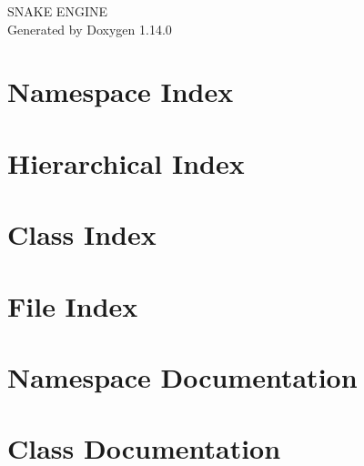 \documentclass[twoside]{book}
\newcommand{\+}{\discretionary{\mbox{\scriptsize$\hookleftarrow$}}{}{}}
\newcommand{\clearemptydoublepage}{%
    \newpage{\pagestyle{empty}\cleardoublepage}%
  }
\begin{document}
  \raggedbottom
    \hypersetup{pageanchor=false,
                bookmarksnumbered=true,
                pdfencoding=unicode
               }
  \begin{titlepage}
  \vspace*{7cm}
  \begin{center}%
  {\Large SNAKE ENGINE}\\
  \vspace*{1cm}
  {\large Generated by Doxygen 1.14.0}\\
  \end{center}
  \end{titlepage}
  \clearemptydoublepage
  \tableofcontents
  \clearemptydoublepage
  \hypersetup{pageanchor=true}
\chapter{Namespace Index}

\chapter{Hierarchical Index}

\chapter{Class Index}

\chapter{File Index}

\chapter{Namespace Documentation}

\chapter{Class Documentation}









































\end{document}
